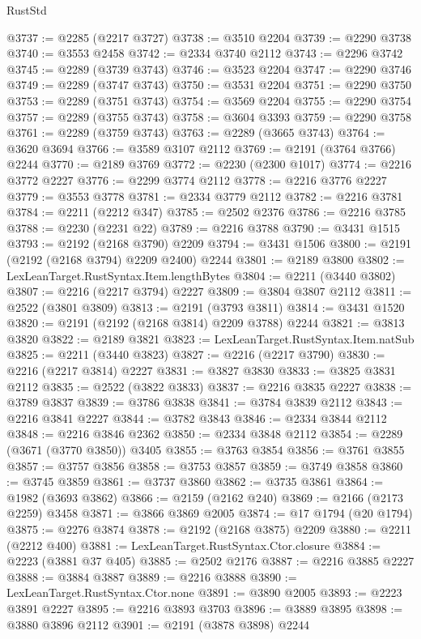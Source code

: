 \begin{lexlean}{RustStd}
\begin{coremodule}
@3737 := @2285 (@2217 @3727)
@3738 := @3510 @2204
@3739 := @2290 @3738
@3740 := @3553 @2458
@3742 := @2334 @3740 @2112
@3743 := @2296 @3742
@3745 := @2289 (@3739 @3743)
@3746 := @3523 @2204
@3747 := @2290 @3746
@3749 := @2289 (@3747 @3743)
@3750 := @3531 @2204
@3751 := @2290 @3750
@3753 := @2289 (@3751 @3743)
@3754 := @3569 @2204
@3755 := @2290 @3754
@3757 := @2289 (@3755 @3743)
@3758 := @3604 @3393
@3759 := @2290 @3758
@3761 := @2289 (@3759 @3743)
@3763 := @2289 (@3665 @3743)
@3764 := @3620 @3694
@3766 := @3589 @3107 @2112
@3769 := @2191 (@3764 @3766) @2244
@3770 := @2189 @3769
@3772 := @2230 (@2300 @1017)
@3774 := @2216 @3772 @2227
@3776 := @2299 @3774 @2112
@3778 := @2216 @3776 @2227
@3779 := @3553 @3778
@3781 := @2334 @3779 @2112
@3782 := @2216 @3781
@3784 := @2211 (@2212 @347)
@3785 := @2502 @2376
@3786 := @2216 @3785
@3788 := @2230 (@2231 @22)
@3789 := @2216 @3788
@3790 := @3431 @1515
@3793 := @2192 (@2168 @3790) @2209
@3794 := @3431 @1506
@3800 := @2191 (@2192 (@2168 @3794) @2209 @2400) @2244
@3801 := @2189 @3800
@3802 := LexLeanTarget.RustSyntax.Item.lengthBytes
@3804 := @2211 (@3440 @3802)
@3807 := @2216 (@2217 @3794) @2227
@3809 := @3804 @3807 @2112
@3811 := @2522 (@3801 @3809)
@3813 := @2191 (@3793 @3811)
@3814 := @3431 @1520
@3820 := @2191 (@2192 (@2168 @3814) @2209 @3788) @2244
@3821 := @3813 @3820
@3822 := @2189 @3821
@3823 := LexLeanTarget.RustSyntax.Item.natSub
@3825 := @2211 (@3440 @3823)
@3827 := @2216 (@2217 @3790)
@3830 := @2216 (@2217 @3814) @2227
@3831 := @3827 @3830
@3833 := @3825 @3831 @2112
@3835 := @2522 (@3822 @3833)
@3837 := @2216 @3835 @2227
@3838 := @3789 @3837
@3839 := @3786 @3838
@3841 := @3784 @3839 @2112
@3843 := @2216 @3841 @2227
@3844 := @3782 @3843
@3846 := @2334 @3844 @2112
@3848 := @2216 @3846 @2362
@3850 := @2334 @3848 @2112
@3854 := @2289 (@3671 (@3770 @3850)) @3405
@3855 := @3763 @3854
@3856 := @3761 @3855
@3857 := @3757 @3856
@3858 := @3753 @3857
@3859 := @3749 @3858
@3860 := @3745 @3859
@3861 := @3737 @3860
@3862 := @3735 @3861
@3864 := @1982 (@3693 @3862)
@3866 := @2159 (@2162 @240)
@3869 := @2166 (@2173 @2259) @3458
@3871 := @3866 @3869 @2005
@3874 := @17 @1794 (@20 @1794)
@3875 := @2276 @3874
@3878 := @2192 (@2168 @3875) @2209
@3880 := @2211 (@2212 @400)
@3881 := LexLeanTarget.RustSyntax.Ctor.closure
@3884 := @2223 (@3881 @37 @405)
@3885 := @2502 @2176
@3887 := @2216 @3885 @2227
@3888 := @3884 @3887
@3889 := @2216 @3888
@3890 := LexLeanTarget.RustSyntax.Ctor.none
@3891 := @3890 @2005
@3893 := @2223 @3891 @2227
@3895 := @2216 @3893 @3703
@3896 := @3889 @3895
@3898 := @3880 @3896 @2112
@3901 := @2191 (@3878 @3898) @2244

\end{coremodule}
\end{lexlean}
